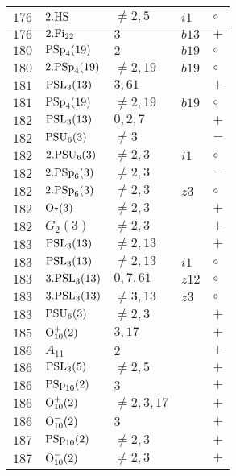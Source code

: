 \documentclass[a4paper, 11pt]{article}
\begin{document}
\begin{longtable}{lllll}
		$176$ & $2.{\rm HS}$ & $\neq 2,5$ & $i1$ & $\circ$ \\ \hline
		$176$ & $2.{\rm Fi}_{22}$ & $3$ & $b13$ & $+$ \\ \hline
		$180$ & ${\rm PSp}_{4}(19)$ & $2$ & $b19$ & $\circ$ \\ \hline
		$180$ & $2.{\rm PSp}_{4}(19)$ & $\neq 2,19$ & $b19$ & $\circ$ \\ \hline
		$181$ & ${\rm PSL}_{3}(13)$ & $3, 61$ &  & $+$ \\ \hline
		$181$ & ${\rm PSp}_{4}(19)$ & $\neq 2,19$ & $b19$ & $\circ$ \\ \hline
		$182$ & ${\rm PSL}_{3}(13)$ & $0,2,7$ &  & $+$ \\ \hline
		$182$ & ${\rm PSU}_{6}(3)$ & $\neq 3$ &  & $-$ \\ \hline
		$182$ & $2.{\rm PSU}_{6}(3)$ & $\neq 2,3$ & $i1$ & $\circ$ \\ \hline
		$182$ & $2.{\rm PSp}_{6}(3)$ & $\neq 2,3$ &  & $-$ \\ \hline
		$182$ & $2.{\rm PSp}_{6}(3)$ & $\neq 2,3$ & $z3$ & $\circ$ \\ \hline
		$182$ & ${\rm O}_{7}(3)$ & $\neq 2,3$ &  & $+$ \\ \hline
		$182$ & $G_{2}(3)$ & $\neq 2,3$ &  & $+$ \\ \hline
		$183$ & ${\rm PSL}_{3}(13)$ & $\neq 2,13$ &  & $+$ \\ \hline
		$183$ & ${\rm PSL}_{3}(13)$ & $\neq 2,13$ & $i1$ & $\circ$ \\ \hline
		$183$ & $3.{\rm PSL}_{3}(13)$ & $0, 7, 61$ & $z12$ & $\circ$ \\ \hline
		$183$ & $3.{\rm PSL}_{3}(13)$ & $\neq 3,13$ & $z3$ & $\circ$ \\ \hline
		$183$ & ${\rm PSU}_{6}(3)$ & $\neq 2,3$ &  & $+$ \\ \hline
		$185$ & ${\rm O}_{10}^+(2)$ & $3, 17$ &  & $+$ \\ \hline
		$186$ & $A_{11}$ & $2$ &  & $+$ \\ \hline
		$186$ & ${\rm PSL}_{3}(5)$ & $\neq 2,5$ &  & $+$ \\ \hline
		$186$ & ${\rm PSp}_{10}(2)$ & $3$ &  & $+$ \\ \hline
		$186$ & ${\rm O}_{10}^+(2)$ & $\neq 2,3,17$ &  & $+$ \\ \hline
		$186$ & ${\rm O}_{10}^-(2)$ & $3$ &  & $+$ \\ \hline
		$187$ & ${\rm PSp}_{10}(2)$ & $\neq 2,3$ &  & $+$ \\ \hline
		$187$ & ${\rm O}_{10}^-(2)$ & $\neq 2,3$ &  & $+$ \\ \hline

\end{longtable}
\end{document}
